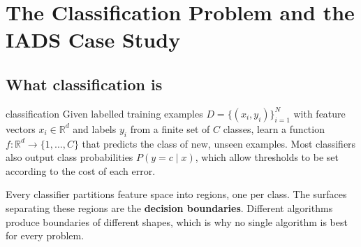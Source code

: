 \documentclass[11pt]{article}
\begin{document}
\tableofcontents
\newpage

\section{The Classification Problem and the IADS Case Study}
\subsection{What classification is}
\begin{definition}{classification}
Given labelled training examples $D=\{(x_i,y_i)\}_{i=1}^N$ with feature vectors $x_i\in\mathbb R^d$ and labels $y_i$ from a finite set of $C$ classes, learn a function $f:\mathbb R^d\to\{1,\ldots,C\}$ that predicts the class of new, unseen examples. Most classifiers also output class probabilities $P(y=c\mid x)$, which allow thresholds to be set according to the cost of each error.
\end{definition}
Every classifier partitions feature space into regions, one per class. The surfaces separating these regions are the \textbf{decision boundaries}. Different algorithms produce boundaries of different shapes, which is why no single algorithm is best for every problem.
\end{document}
